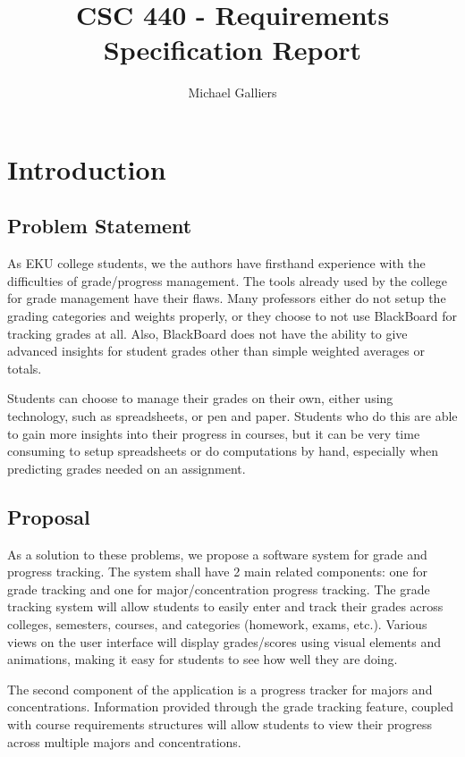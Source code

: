 \documentclass[12pt]{article}
\author{Michael Galliers}
\title{CSC 440 - Requirements Specification Report}
\begin{document}
\begin{titlepage}
\maketitle
\end{titlepage}

\newpage
    \tableofcontents
\newpage

\thispagestyle{empty}
\listoffigures
\newpage

\section{Introduction}
\subsection{Problem Statement}
As EKU college students, we the authors have firsthand experience with the difficulties of
grade/progress management. The tools already used by the college for grade management have their
flaws. Many professors either do not setup the grading categories and weights properly, or they
choose to not use BlackBoard for tracking grades at all. Also, BlackBoard does not have the ability
to give advanced insights for student grades other than simple weighted averages or totals.

Students can choose to manage their grades on their own, either using technology, such as
spreadsheets, or pen and paper. Students who do this are able to gain more insights into their
progress in courses, but it can be very time consuming to setup spreadsheets or do computations by
hand, especially when predicting grades needed on an assignment.

\subsection{Proposal}
As a solution to these problems, we propose a software system for grade and progress tracking. The
system shall have 2 main related components: one for grade tracking and one for major/concentration
progress tracking. The grade tracking system will allow students to easily enter and track their
grades across colleges, semesters, courses, and categories (homework, exams, etc.). Various views on
the user interface will display grades/scores using visual elements and animations, making it easy
for students to see how well they are doing.

The second component of the application is a progress tracker for majors and concentrations.
Information provided through the grade tracking feature, coupled with course requirements structures
will allow students to view their progress across multiple majors and concentrations.
\end{document}

